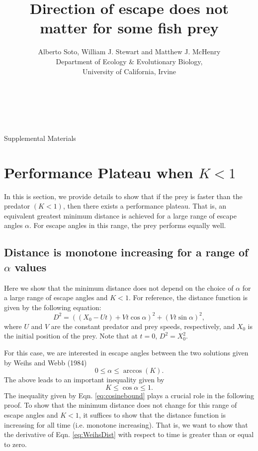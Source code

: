 \documentclass[12pt]{article}
\title{Direction of escape does not matter for some fish prey}
\author{Alberto Soto, William J. Stewart and Matthew J. McHenry\\
  Department of Ecology \& Evolutionary Biology,\\
  University of California, Irvine\\ \\ \\ \\}
\begin{document}

\maketitle
{\Large Supplemental Materials}

\tableofcontents

\newpage
\section{Performance Plateau when $K < 1$}
In this is section, we provide details to show that if the prey is faster than the predator $(K<1)$, then there exists a performance plateau. That is, an equivalent greatest minimum distance is  achieved for a large range of escape angles $\alpha$. For escape angles in this range, the prey performs equally well.   

\subsection{Distance is monotone increasing for a range of $\alpha$ values}
Here we show that the minimum distance does not depend on the choice of $\alpha$ for a large range of escape angles and $K<1$. For reference, the distance function is given by the following equation:
%
\begin{equation}
D^2 = ((X_0 - Ut) + Vt\cos\alpha)^2 + (Vt\sin\alpha)^2,
\label{eq:WeihsDist}
\end{equation}
%
where $U$ and $V$ are the constant predator and prey speeds, respectively, and $X_0$ is the initial position of the prey. Note that at $t=0$, $D^2 = X_0^2.$ 

For this case, we are interested in escape angles between the two solutions given by Weihs and Webb (1984)
%
\begin{equation}
0 \leq \alpha \leq \arccos(K).
\label{alpharange}
\end{equation}
The above leads to an important inequality given by
\begin{equation}
K \leq \cos\alpha \leq 1.
\label{eq:cosinebound}
\end{equation} 
The inequality given by Eqn. \ref{eq:cosinebound} plays a crucial role in the following proof. To show that the minimum distance does not change for this range of escape angles and $K<1$, it suffices to show that the distance function is increasing for all time (i.e. monotone increasing). That is, we want to show that the derivative of Eqn. \ref{eq:WeihsDist} with respect to time is greater than or equal to zero. 
\end{document}
